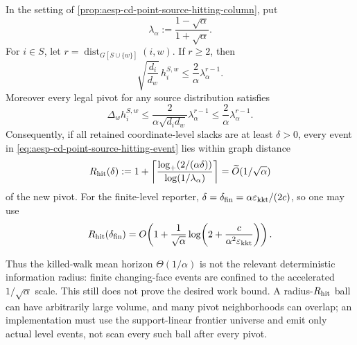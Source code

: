 \begin{lemma}
\label{lem:aesp-cd-point-source-hitting-radius}
In the setting of
\cref{prop:aesp-cd-point-source-hitting-column}, put
\begin{equation*}
 \lambda_\alpha:=\frac{1-\sqrt\alpha}{1+\sqrt\alpha}.
\end{equation*}
For \(i\in S\), let
\(r=\operatorname{dist}_{G[S\cup\{w\}]}(i,w)\).  If \(r\geq2\), then
\begin{equation}
 \sqrt{\frac{d_i}{d_w}}\,h_i^{S,w}
 \leq \frac2\alpha\lambda_\alpha^{r-1}.
 \label{eq:aesp-cd-point-source-hitting-radius}
\end{equation}
Moreover every legal pivot for any source distribution satisfies
\begin{equation}
 \Delta_w h_i^{S,w}
 \leq \frac2{\alpha\sqrt{d_id_w}}
       \lambda_\alpha^{r-1}
 \leq \frac2\alpha\lambda_\alpha^{r-1}.
 \label{eq:aesp-cd-point-source-hitting-event-radius}
\end{equation}
Consequently, if all retained coordinate-level slacks are at least
\(\delta>0\), every event in
\cref{eq:aesp-cd-point-source-hitting-event} lies within graph distance
\begin{equation}
 R_{\rm hit}(\delta)
 :=1+\left\lceil
   \frac{\log_+(2/(\alpha\delta))}
        {\log(1/\lambda_\alpha)}
 \right\rceil
 =\widetilde O(1/\sqrt\alpha)
 \label{eq:aesp-cd-point-source-hitting-event-locality}
\end{equation}
of the new pivot.  For the finite-level reporter,
\(\delta=\delta_{\rm fin}=\alpha\varepsilon_{\mathrm{kkt}}/(2c)\), so one may use
\begin{equation*}
 R_{\rm hit}(\delta_{\rm fin})
 =O\!\left(
  1+\frac1{\sqrt\alpha}
  \log\!\left(2+\frac{c}{\alpha^2\varepsilon_{\mathrm{kkt}}}\right)
 \right).
\end{equation*}

Thus the killed-walk mean horizon \(\Theta(1/\alpha)\) is not the relevant
deterministic information radius: finite changing-face events are confined
to the accelerated \(1/\sqrt\alpha\) scale.  This still does not prove the
desired work bound.  A radius-\(R_{\rm hit}\) ball can have arbitrarily large
volume, and many pivot neighborhoods can overlap; an implementation must
use the support-linear frontier universe and emit only actual level events,
not scan every such ball after every pivot.
\end{lemma}

